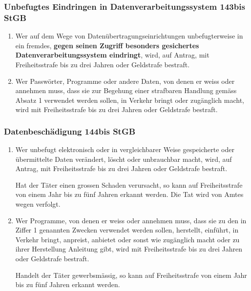 \documentclass[11pt]{article}
\theoremstyle{definition}
\begin{document}
\subsubsection{Unbefugtes Eindringen in Datenverarbeitungssystem 143bis StGB}
\begin{enumerate}[label=\arabic* ]
	\item Wer auf dem Wege von Datenübertragungseinrichtungen unbefugterweise in ein fremdes, \textbf{gegen seinen Zugriff besonders gesichertes Datenverarbeitungssystem eindringt}, wird, auf Antrag, mit Freiheitsstrafe bis zu drei Jahren oder Geldstrafe bestraft.
	\item Wer Passwörter, Programme oder andere Daten, von denen er weiss oder annehmen muss, dass sie zur Begehung einer strafbaren Handlung gemäss Absatz 1 verwendet werden sollen, in Verkehr bringt oder zugänglich macht, wird mit Freiheitsstrafe bis zu drei Jahren oder Geldstrafe bestraft.
\end{enumerate}

\subsubsection{Datenbeschädigung 144bis StGB}
\begin{enumerate}[label=\arabic* ]
	\item Wer unbefugt elektronisch oder in vergleichbarer Weise gespeicherte oder übermittelte Daten verändert, löscht oder unbrauchbar macht, wird, auf Antrag, mit Freiheitsstrafe bis zu drei Jahren oder Geldstrafe bestraft.
	
	Hat der Täter einen grossen Schaden verursacht, so kann auf Freiheitsstrafe von einem Jahr bis zu fünf Jahren erkannt werden. Die Tat wird von Amtes wegen verfolgt.
	\item Wer Programme, von denen er weiss oder annehmen muss, dass sie zu den in Ziffer 1 genannten Zwecken verwendet werden sollen, herstellt, einführt, in Verkehr bringt, anpreist, anbietet oder sonst wie zugänglich macht oder zu ihrer Herstellung Anleitung gibt, wird mit Freiheitsstrafe bis zu drei Jahren oder Geldstrafe bestraft.
	
	Handelt der Täter gewerbsmässig, so kann auf Freiheitsstrafe von einem Jahr bis zu fünf Jahren erkannt werden.
\end{enumerate}
\end{document}
